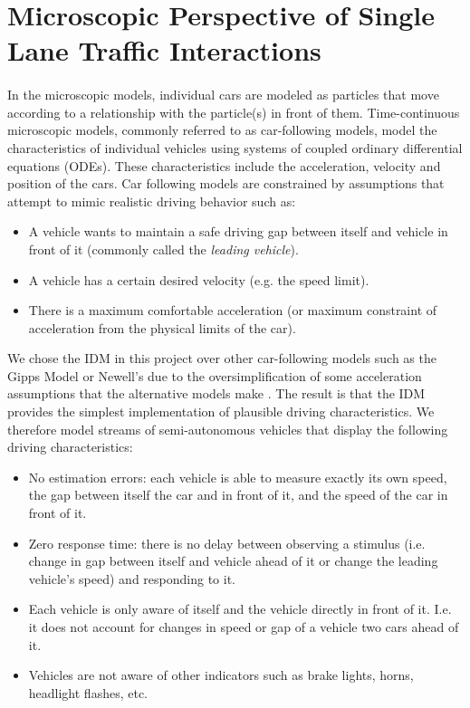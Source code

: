 \documentclass[12pt]{article}
\begin{document}
\section{Microscopic Perspective of Single Lane Traffic Interactions}
\paragraph{} In the microscopic models, individual cars are modeled as particles that move according to a relationship with the particle(s) in front of them.  Time-continuous microscopic models, commonly referred to as car-following models, model the characteristics of individual vehicles using systems of coupled ordinary differential equations (ODEs). These characteristics include the acceleration, velocity and position of the cars.  Car following models are constrained by assumptions \cite[chapter~10]{treiber_kesting_2013} that attempt to mimic realistic driving behavior such as:
\begin{itemize}
\item A vehicle wants to maintain a safe driving gap between itself and vehicle in front of it (commonly called the \textit{leading vehicle}).
\item A vehicle has a certain desired velocity (e.g. the speed limit).
\item There is a maximum comfortable acceleration (or maximum constraint of acceleration from the physical limits of the car).
\end{itemize}
We chose the IDM in this project over other car-following models such as the Gipps Model or Newell's due to the oversimplification of some acceleration assumptions that the alternative models make \cite[chapter~11]{treiber_kesting_2013}. The result is that the IDM provides the simplest implementation of plausible driving characteristics. We therefore model streams of semi-autonomous vehicles that display the following driving characteristics:
\begin{itemize}
  \item No estimation errors: each vehicle is able to measure exactly its own speed, the gap between itself the car and in front of it, and the speed of the car in front of it.
  \item Zero response time: there is no delay between observing a stimulus (i.e. change in gap between itself and vehicle ahead of it or change the leading vehicle's speed) and responding to it.
  \item Each vehicle is only aware of itself and the vehicle directly in front of it.  I.e. it does not account for changes in speed or gap of a vehicle two cars ahead of it.
  \item Vehicles are not aware of other indicators such as brake lights, horns, headlight flashes, etc.
\end{itemize}
\end{document}

